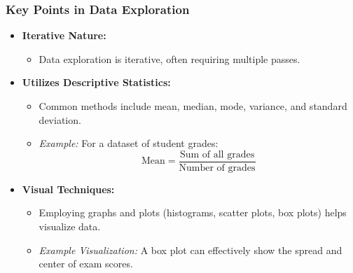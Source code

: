 \documentclass[aspectratio=169]{beamer}
\begin{document}
\begin{frame}[fragile]
    \frametitle{Key Points in Data Exploration}
    \begin{itemize}
        \item \textbf{Iterative Nature:} 
            \begin{itemize}
                \item Data exploration is iterative, often requiring multiple passes.
            \end{itemize}
        \item \textbf{Utilizes Descriptive Statistics:} 
            \begin{itemize}
                \item Common methods include mean, median, mode, variance, and standard deviation.
                \item \textit{Example:} For a dataset of student grades: 
                \begin{equation}
                \text{Mean} = \frac{\text{Sum of all grades}}{\text{Number of grades}}
                \end{equation}
            \end{itemize}
        \item \textbf{Visual Techniques:} 
            \begin{itemize}
                \item Employing graphs and plots (histograms, scatter plots, box plots) helps visualize data.
                \item \textit{Example Visualization:} A box plot can effectively show the spread and center of exam scores.
            \end{itemize}
    \end{itemize}
\end{frame}
\end{document}
